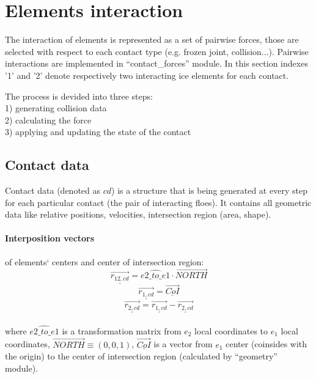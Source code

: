 \section{Elements interaction}

The interaction of elements is represented as a set of pairwise forces, 
those are selected with respect to each contact type (e.g. frozen joint, collision...).
Pairwise interactions are implemented in ``contact\_forces'' module.
In this section indexes '1' and '2' denote respectively two interacting 
ice elements for each contact. 

The process is devided into three steps:\\
1) generating collision data\\
2) calculating the force\\
3) applying and updating the state of the contact

\subsection{Contact data}

Contact data (denoted as $cd$) is a structure that is being generated
at every step for each particular contact (the pair of interacting floes).
It contains all geometric data like relative positions, velocities, 
intersection region (area, shape).
\\
\paragraph{Interposition vectors} of elements` centers and center of intersection region:
\begin{equation}
 \underline{\vec{r_{12,cd}}} = \hat{e2\_to\_e1} \cdot \vec{NORTH}
\end{equation}
\begin{equation}
 \underline{\vec{r_{1,cd}}} = \underline{\vec{CoI}}
 \end{equation}
\begin{equation}
 \underline{\vec{r_{2,cd}}} = \underline{\vec{r_{1,cd}}} - \underline{\vec{r_{2,cd}}}
 \end{equation}
 \\where $\hat{e2\_to\_e1}$ is a transformation matrix from $e_2$ local coordinates
 to $e_1$ local coordinates, $\vec{NORTH} \equiv (0, 0, 1)$,
 $\underline{\vec{CoI}}$ is a vector from $e_1$ center (coinsides with the origin)
 to the center of intersection region (calculated by ``geometry'' module).
 
